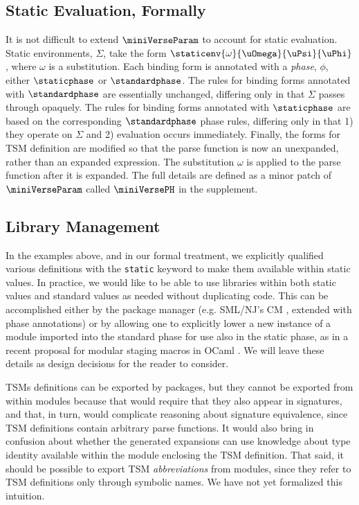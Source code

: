 \documentclass[acmlarge,review,anonymous]{acmart}\settopmatter{printfolios=true}
\newcommand{\li}[1]{\lstinline{#1}}
\begin{document}
\subsection{Static Evaluation, Formally}
It is not difficult to extend $\miniVerseParam$ to account for static evaluation. Static environments, $\Sigma$, take the form $\staticenv{\omega}{\uOmega}{\uPsi}{\uPhi}$, where $\omega$ is a substitution. Each binding form is annotated with a \emph{phase}, $\phi$, either $\staticphase$ or $\standardphase$. The rules for binding forms annotated with $\standardphase$ are essentially unchanged, differing only in that $\Sigma$ passes through opaquely. The rules for binding forms annotated with $\staticphase$ are based on the corresponding $\standardphase$ phase rules, differing only in that 1) they operate on $\Sigma$ and 2) evaluation occurs immediately. Finally, the forms for TSM definition are modified so that the parse function is now an unexpanded, rather than an expanded expression. The substitution $\omega$ is applied to the parse function after it is expanded. The full details are defined as a minor patch of $\miniVerseParam$ called $\miniVersePH$ in the supplement.

\subsection{Library Management}
In the examples above, and in our formal treatment, we explicitly qualified various definitions with the \li{static} keyword to make them available within static values. In practice, we would like to be able to use libraries within both static values and standard values as needed without duplicating code. This can be accomplished either by the package manager (e.g. SML/NJ's CM \cite{blume:smlnj-cm}, extended with phase annotations) or by allowing one to explicitly lower a new instance of a module imported into the standard phase for use also in  the static phase, as in a recent proposal for modular staging macros in OCaml \cite{Ocaml/macros}. We will leave these details as design decisions for the reader to consider.

TSMs definitions can be exported by packages, but they cannot be exported from within modules because that would require that they also appear in signatures, and that, in turn, would complicate reasoning about signature equivalence, since TSM definitions contain arbitrary parse functions. It would also bring in confusion about whether the generated expansions can use knowledge about type identity available  within the module enclosing the TSM definition. That said, it should be possible to export TSM \emph{abbreviations} from modules, since they refer to TSM definitions only through symbolic names. We have not yet formalized this intuition. 
\end{document}
